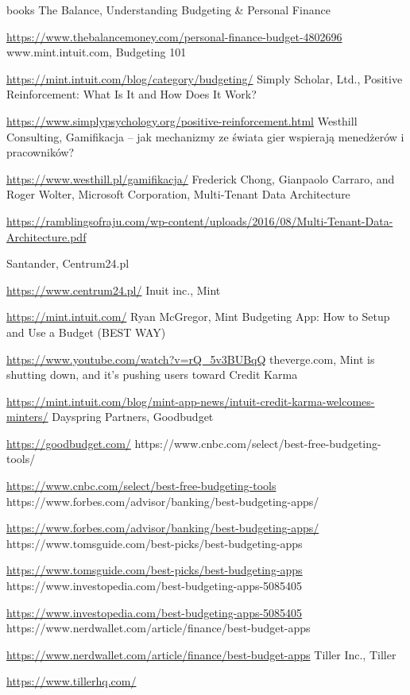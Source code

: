 \documentclass[a4paper, 10pt, twoside, openright]{report}
\begin{document}
\begin{large}
\begin{thebibliography} {books}
     The Balance, Understanding Budgeting \& Personal Finance\raggedright\url{
        https://www.thebalancemoney.com/personal-finance-budget-4802696}
     www.mint.intuit.com, Budgeting 101 \raggedright\url{
        https://mint.intuit.com/blog/category/budgeting/}
     Simply Scholar, Ltd., Positive Reinforcement: What Is It and How Does It Work? \raggedright\url{
        https://www.simplypsychology.org/positive-reinforcement.html}
         Westhill Consulting, Gamifikacja – jak mechanizmy ze świata gier wspierają menedżerów i pracowników? \raggedright\url{
            https://www.westhill.pl/gamifikacja/}
     Frederick Chong, Gianpaolo Carraro, and Roger Wolter, Microsoft Corporation, Multi‐Tenant Data Architecture \raggedright\url{
        https://ramblingsofraju.com/wp-content/uploads/2016/08/Multi-Tenant-Data-Architecture.pdf}

     Santander, Centrum24.pl \raggedright\url{
        https://www.centrum24.pl/}
     Inuit inc., Mint \raggedright\url{
        https://mint.intuit.com/}
     Ryan McGregor, Mint Budgeting App: How to Setup and Use a Budget (BEST WAY) \raggedright\url{
        https://www.youtube.com/watch?v=rQ_5v3BUBqQ}
     theverge.com, Mint is shutting down, and it’s pushing users toward Credit Karma \raggedright\url{
        https://mint.intuit.com/blog/mint-app-news/intuit-credit-karma-welcomes-minters/}
     Dayspring Partners, Goodbudget \raggedright\url{
        https://goodbudget.com/}
     https://www.cnbc.com/select/best-free-budgeting-tools/ \raggedright\url{
        https://www.cnbc.com/select/best-free-budgeting-tools}
     https://www.forbes.com/advisor/banking/best-budgeting-apps/ \raggedright\url{
        https://www.forbes.com/advisor/banking/best-budgeting-apps/}
     https://www.tomsguide.com/best-picks/best-budgeting-apps \raggedright\url{
        https://www.tomsguide.com/best-picks/best-budgeting-apps}
     https://www.investopedia.com/best-budgeting-apps-5085405 \raggedright\url{
        https://www.investopedia.com/best-budgeting-apps-5085405}
     https://www.nerdwallet.com/article/finance/best-budget-apps \raggedright\url{
        https://www.nerdwallet.com/article/finance/best-budget-apps}
     Tiller Inc., Tiller \raggedright\url{
        https://www.tillerhq.com/}


\end{thebibliography}
\end{large}
\end{document}
